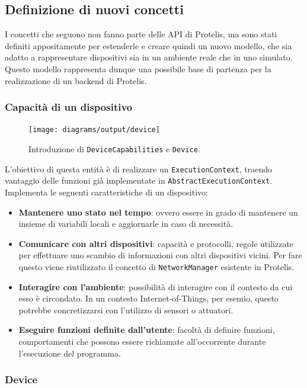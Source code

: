 \subsection{Definizione di nuovi concetti}
I concetti che seguono non fanno parte delle API di Protelis, ma sono stati
definiti appositamente per estenderle e creare quindi un nuovo modello, che sia
adatto a rappresentare dispositivi sia in un ambiente reale che in uno simulato.
Questo modello rappresenta dunque una possibile base di partenza per la
realizzazione di un backend di Protelis.

\subsubsection{Capacità di un dispositivo}
\label{sec:device-capabilities}

\begin{figure}
  \centering
  \texttt{[image: diagrams/output/device]}
  \caption{Introduzione di \texttt{DeviceCapabilities} e \texttt{Device}.}
  \label{fig:uml-device}
\end{figure}

L'obiettivo di questa entità è di realizzare un \texttt{ExecutionContext},
traendo vantaggio delle funzioni già implementate in
\texttt{AbstractExecutionContext}. Implementa le seguenti caratteristiche di un dispositivo:
\begin{itemize}
\item \textbf{Mantenere uno stato nel tempo}: ovvero essere in grado di
  mantenere un insieme di variabili locali e aggiornarle in caso di necessità.
\item \textbf{Comunicare con altri dispositivi}: capacità e protocolli, regole
  utilizzate per effettuare uno scambio di informazioni con altri dispositivi
  vicini. Per fare questo viene riutilizzato il concetto di
  \texttt{NetworkManager} esistente in Protelis.
\item \textbf{Interagire con l'ambiente}: possibilità di interagire con il
  contesto da cui esso è circondato. In un contesto Internet-of-Things, per
  esemio, questo potrebbe concretizzarsi con l'utilizzo di sensori o attuatori.
\item \textbf{Eseguire funzioni definite dall'utente}: facoltà di definire
  funzioni, comportamenti che possono essere richiamate all'occorrente durante
  l'esecuzione del programma.
\end{itemize}

\subsubsection{Device}


